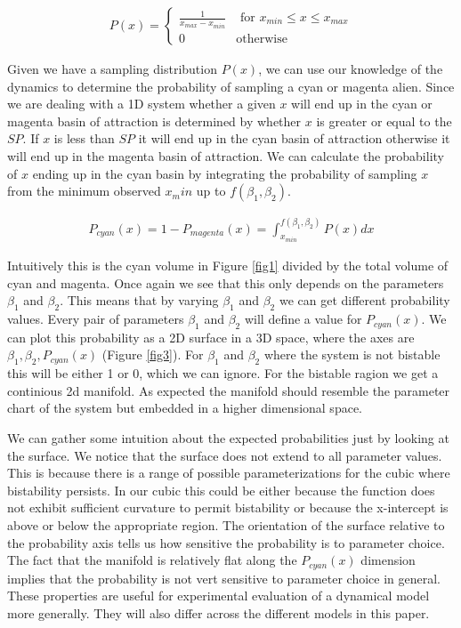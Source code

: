 \documentclass[letterpaper]{article}
\begin{document}
\begin{eqnarray}
    P(x) = \begin{cases}
        \frac{1}{x_{max} - x_{min}} & \text{ for } x_{min}\leq x\leq x_{max}\\
        0 & \text{otherwise}
    \end{cases}
\end{eqnarray}

Given we have a sampling distribution $P(x)$, we can use our knowledge of the dynamics
to determine the probability of sampling a cyan or magenta alien. Since we are dealing
with a 1D system whether a given $x$ will end up in the cyan or magenta basin of attraction
is determined by whether $x$ is greater or equal to the $SP$. If $x$ is less than
$SP$ it will end up in the cyan basin of attraction otherwise it will
end up in the magenta basin of attraction. We can calculate the probability of $x$ ending
up in the cyan basin by integrating the probability of sampling $x$ 
from the minimum observed $x_min$ up to $f(\beta_1,\beta_2)$.

\begin{eqnarray}
    P_{cyan}(x) = 1 - P_{magenta}(x) = \int^{f(\beta_1,\beta_2)}_{x_{min}}
    P(x) dx
\end{eqnarray}

Intuitively this is the cyan volume in Figure \ref{fig1} divided by the total volume
of cyan and magenta. 
Once again we see that this only depends on the parameters $\beta_1$ and
$\beta_2$. This means that by varying $\beta_1$ and $\beta_2$ we can get different 
probability values. Every pair of parameters $\beta_1$ and $\beta_2$ will define a 
value for $P_{cyan}(x)$.
We can plot this probability as a 2D surface in a 3D space, where the axes
are $\beta_1,\beta_2,P_{cyan}(x)$ (Figure \ref{fig3}). For $\beta_1$ and $\beta_2$ where
the system is not bistable this will be either 1 or 0, which we can ignore. For the bistable
ragion we get a continious 2d manifold. As expected the manifold should resemble the 
parameter chart of the system but embedded in a higher dimensional space.

We can gather some intuition about the expected probabilities just by looking at the 
surface. We notice that the surface
does not extend to all parameter values. This is because there is a range of possible
parameterizations for the cubic where bistability persists. In our cubic this could
be either because the function does not exhibit sufficient curvature to permit bistability 
or because the x-intercept is above or below the appropriate region.
The orientation of the surface relative to the probability axis tells us how sensitive the 
probability is to parameter choice. The fact that the manifold is relatively flat along the
$P_{cyan}(x)$ dimension implies that the probability is not vert sensitive to parameter choice
in general. These properties are useful for experimental evaluation of a dynamical model
more generally. They will also differ across the different models in this paper.
\end{document}
